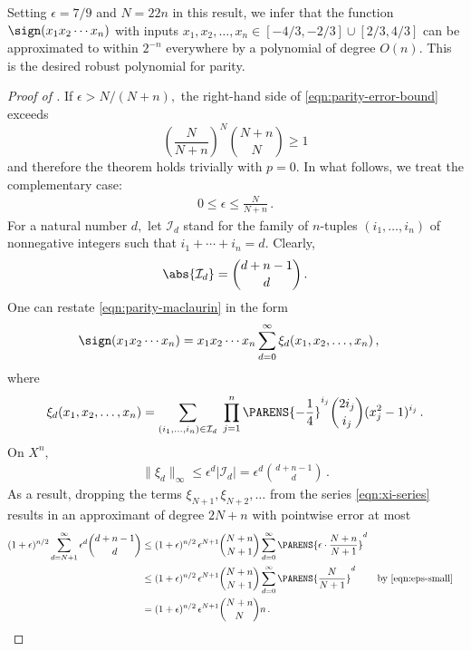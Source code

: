 Setting $\epsilon=7/9$ and $N=22n$ in this result, we infer that
the function $\sign (x_1x_2\cdots x_n)$ with inputs
$x_1,x_2,\dots,x_n\in[-4/3,-2/3]\cup[2/3,4/3]$ can be
approximated to within $2^{-n}$ everywhere 
by a polynomial of degree $O(n)$. This is the
desired robust polynomial for parity.

\begin{proof}[Proof of ]
If $\epsilon>N/{(N+n)},$ the right-hand side of 
\eqref{eqn:parity-error-bound} exceeds 
\[
\left(\frac N{N+n}\right)^N{N+n\choose N}\geq1
\]
and therefore the theorem holds trivially with $p=0$. 
In what follows, we treat the complementary case:
\begin{align}
\label{eqn:eps-small}
0\leq\epsilon\leq\frac N{N+n}\,.
\end{align}
For a natural number $d,$ let
$\mathcal{I}_d$ stand for the family of $n$-tuples
$(i_1,\dots,i_n)$ of nonnegative integers such that
$i_1+\cdots+i_n=d$. Clearly,
\begin{align*}
\abs{\mathcal{I}_d} = {d+n-1\choose d}\,.
\end{align*}
One can restate \eqref{eqn:parity-maclaurin} in the
form
\begin{align}
\sign(x_1x_2\cdots x_n) 
  &= x_1x_2\cdots x_n \sum_{d=0}^\infty
  \xi_d(x_1,x_2,\dots,x_n)\,,
\label{eqn:xi-series}
\end{align}
where
\begin{align*}
 \xi_d(x_1,x_2,\dots,x_n) = \sum_{(i_1,\dots,i_n)\in
 \mathcal I_d}
  \;\prod_{j=1}^n 
       \PARENS{-\frac14}^{i_j}{2i_j \choose i_j} (x_j^2-1)^{i_j}\,.
\end{align*}
On $X^n,$ 
\begin{align*}
\|\xi_d\|_\infty \leq \epsilon^d |\mathcal I_d|
=\epsilon^d{d+n-1\choose d}\,.
\end{align*}
As a result, dropping the terms
$\xi_{N+1},\xi_{N+2},\dots$ from the series
\eqref{eqn:xi-series} results in an approximant 
of degree $2N+n$ with pointwise error at most
\begin{align*}
(1+\epsilon)^{n/2}\sum_{d=N+1}^\infty
\epsilon^d{d+n-1\choose d}
&\leq (1+\epsilon)^{n/2}\,\epsilon^{N+1}{N+n\choose N+1}
\sum_{d=0}^\infty
\PARENS{\epsilon\cdot\frac{N+n}{N+1}}^d\\
&\leq (1+\epsilon)^{n/2}\,\epsilon^{N+1}{N+n\choose N+1}
\sum_{d=0}^\infty
\PARENS{\frac N{N+1}}^d 
&&\text{by \eqref{eqn:eps-small}}\\
&= (1+\epsilon)^{n/2}\,\epsilon^{N+1}{N+n\choose N}n\,.
&&\qedhere
\end{align*} 
\end{proof}
 

